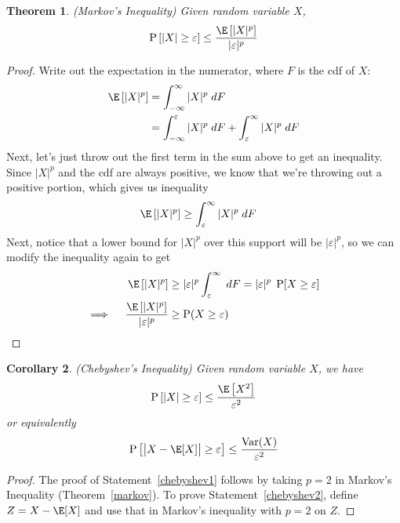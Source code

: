 \documentclass[12pt]{article}
\theoremstyle{plain}
\newtheorem{thm}{Theorem}[section]
\newtheorem{cor}[thm]{Corollary}
\theoremstyle{definition}
\theoremstyle{remark}
\newcommand{\Prb}{\operatorname{P}}
\newcommand{\Var}{\operatorname{Var}}
\begin{document}
\begin{thm}{\emph{(Markov's Inequality)}}
\label{thm:markov}
Given random variable $X$,
\begin{equation}
    \label{markov}
    \Prb\left[
      \left\lvert X\right\rvert
      \geq \varepsilon\right]
    \leq \frac{\E\left[|X|^p\right]}{|\varepsilon|^p}
\end{equation}
\end{thm}

\begin{proof}
Write out the expectation in the numerator, where $F$ is the cdf of $X$:
\begin{align*}
  \E\left[|X|^p\right]
  &= \int^\infty_{-\infty} |X|^p \; dF \\
  &= \int^{\varepsilon}_{-\infty} |X|^p \; dF
    + \int^\infty_{\varepsilon} |X|^p \; dF
\end{align*}
Next, let's just throw out the first term in the sum above to get an
inequality. Since $|X|^p$ and the cdf are always positive, we know that
we're throwing out a positive portion, which gives us inequality
\begin{align*}
  \E\left[|X|^p\right]
  &\geq \int^\infty_{\varepsilon} |X|^p \; dF
\end{align*}
Next, notice that a lower bound for $|X|^p$ over this support will be
$|\varepsilon|^p$, so we can modify the inequality again to get
\begin{align*}
  \E\left[|X|^p\right]
  &\geq  |\varepsilon|^p \int^\infty_{\varepsilon} \; dF
  = |\varepsilon|^p \; \Prb[X\geq \varepsilon] \\
  \implies \quad
  \frac{\E\left[|X|^p\right]}{|\varepsilon|^p}
  &\geq \Prb(X\geq \varepsilon)
\end{align*}
\end{proof}

\begin{cor}{\emph{(Chebyshev's Inequality)}}
Given random variable $X$, we have
\begin{equation}
  \label{chebyshev1}
  \Prb\left[
    \left\lvert X\right\rvert
    \geq \varepsilon\right]
  \leq \frac{\E\left[X^2\right]}{\varepsilon^2}
\end{equation}
or equivalently
\begin{equation}
  \label{chebyshev2}
  \Prb\left[
    \big\lvert X-\E[X]\big\rvert
    \geq \varepsilon\right]
  \leq \frac{\Var(X)}{\varepsilon^2}
\end{equation}
\end{cor}
\begin{proof}
The proof of Statement~\ref{chebyshev1} follows by taking $p=2$ in
Markov's Inequality (Theorem~\ref{markov}).
To prove Statement~\ref{chebyshev2}, define $Z=X-\E[X]$ and use that in
Markov's inequality with $p=2$ on $Z$.
\end{proof}
\end{document}
